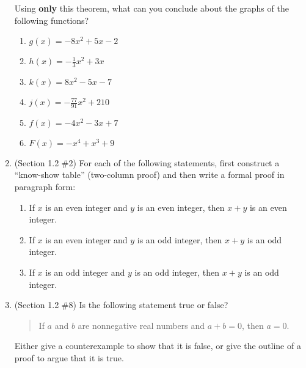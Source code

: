 \documentclass[letterpaper,12pt]{article}
\begin{document}
\begin{enumerate}
Using {\bf only} this theorem, what can you conclude about the graphs of the following functions?
\begin{multicols}{3}
 \begin{enumerate}
  \item $g(x)=-8x^2+5x-2$
  \item $h(x) = -\frac{1}{3}x^2+3x$
  \item $k(x) = 8x^2-5x-7$
  \item $j(x) = -\frac{77}{91}x^2+210$
  \item $f(x) = -4x^2-3x+7$
  \item $F(x) = -x^4+x^3+9$
 \end{enumerate}
\end{multicols}
\pagebreak
\item (Section 1.2 \#2) For each of the following statements, first construct a ``know-show table'' (two-column proof) and then write a formal proof in paragraph form:
\begin{enumerate}
 \item If $x$ is an even integer and $y$ is an even integer, then $x+y$ is an even integer.
 \item If $x$ is an even integer and $y$ is an odd integer, then $x+y$ is an odd integer.
 \item If $x$ is an odd integer and $y$ is an odd integer, then $x+y$ is an odd integer.
\end{enumerate}
\item (Section 1.2 \#8) Is the following statement true or false?
\begin{quotation}
 If $a$ and $b$ are nonnegative real numbers and $a+b=0$, then $a=0$.
\end{quotation}
Either give a counterexample to show that it is false, or give the outline of a proof to argue that it is true.
\end{enumerate}
\end{document}
